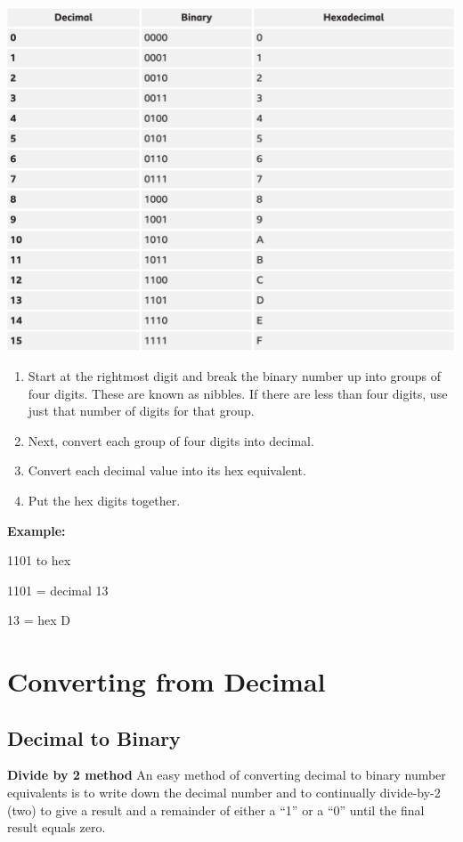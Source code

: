 \documentclass[pstricks,border=11pt]{article}
\begin{document}
\includegraphics[scale=.5]{DBH Table.png}

\begin{enumerate}
    \item Start at the rightmost digit and break the binary number up into groups of four digits. These are known as nibbles. If there are less than four digits, use just that number of digits for that group.
    \item Next, convert each group of four digits into decimal. 
    \item Convert each decimal value into its hex equivalent. 
    \item Put the hex digits together.
\end{enumerate}

\textbf{Example:}

1101 to hex

1101 = decimal 13

13 = hex D

\vspace{5mm}
\section{Converting from Decimal}
\vspace{5mm}
\subsection{Decimal to Binary}
\textbf{Divide by 2 method}
\hfill \break
An easy method of converting decimal to binary number equivalents is to write down the decimal number and to continually divide-by-2 (two) to give a result and a remainder of either a “1” or a “0” until the final result equals zero.
\end{document}
